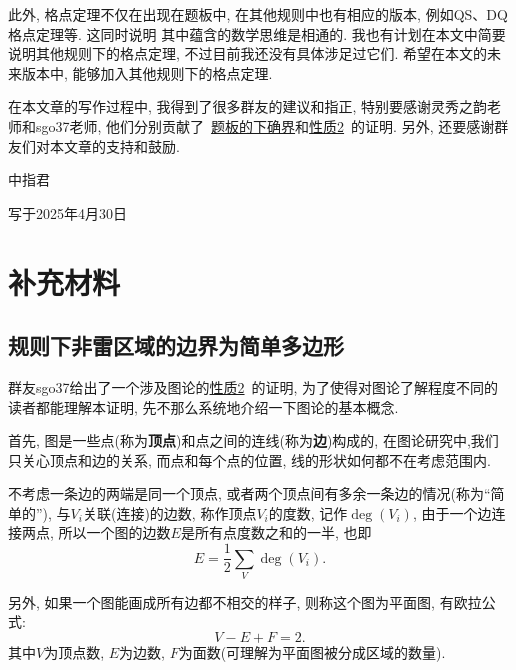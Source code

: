 \documentclass{ctexart}
\newcommand{\varible}[1]{{\Noto[#1]}}
\begin{document}
此外, 格点定理不仅在出现在\varible{O}\varible{Q}题板中, 在其他规则中也有相应的版本, 例如QS、DQ格点定理等. 这同时说明 其中蕴含的数学思维是相通的. 我也有计划在本文中简要说明其他规则下的格点定理, 不过目前我还没有具体涉足过它们. 希望在本文的未来版本中, 能够加入其他规则下的格点定理.

在本文章的写作过程中, 我得到了很多群友的建议和指正, 特别要感谢灵秀之韵老师和sgo37老师, 他们分别贡献了\ \hyperref[inf]{\varible{O}\varible{Q}题板的下确界}和\hyperref[p2]{性质2}\ 的证明. 另外, 还要感谢群友们对本文章的支持和鼓励.

\begin{flushright}
    中指君

    写于2025年4月30日
\end{flushright}
\pagebreak

\appendix

\section{补充材料}
\subsection{\varible{O}\varible{Q}规则下非雷区域的边界为简单多边形}
群友sgo37给出了一个涉及图论的\hyperref[p2]{性质2}\ 的证明, 为了使得对图论了解程度不同的读者都能理解本证明, 先不那么系统地介绍一下图论的基本概念.

首先, 图是一些点(称为\textbf{顶点})和点之间的连线(称为\textbf{边})构成的, 在图论研究中,我们只关心顶点和边的关系, 而点和每个点的位置, 线的形状如何都不在考虑范围内.

不考虑一条边的两端是同一个顶点, 或者两个顶点间有多余一条边的情况(称为``简单的''), 与$V_i$关联(连接)的边数, 称作顶点$V_i$的度数, 记作$\deg(V_i)$, 由于一个边连接两点, 所以一个图的边数$E$是所有点度数之和的一半, 也即
$$
E = \frac{1}{2}\sum_{V}\deg(V_i).
$$

另外, 如果一个图能画成所有边都不相交的样子, 则称这个图为平面图, 有欧拉公式:
$$
V - E + F = 2.
$$
其中$V$为顶点数, $E$为边数, $F$为面数(可理解为平面图被分成区域的数量).
\end{document}
